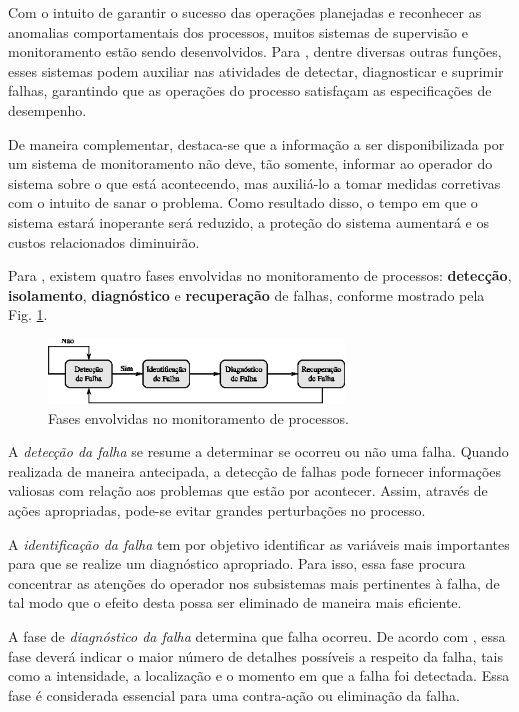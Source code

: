 Com o intuito de garantir o sucesso das operações planejadas e reconhecer as
anomalias comportamentais dos processos, muitos sistemas de supervisão e
monitoramento estão sendo desenvolvidos. Para ,
dentre diversas outras funções, esses sistemas podem auxiliar nas atividades de
detectar, diagnosticar e suprimir falhas, garantindo que as operações do
processo satisfaçam as especificações de desempenho.

De maneira complementar, destaca-se que a informação a ser disponibilizada por
um sistema de monitoramento não deve, tão somente, informar ao operador do
sistema sobre o que está acontecendo, mas auxiliá-lo a tomar medidas corretivas
com o intuito de sanar o problema. Como resultado disso, o tempo em que o
sistema estará inoperante será reduzido, a proteção do sistema aumentará e os
custos relacionados diminuirão.

Para , existem quatro fases envolvidas no monitoramento
de processos: {\bf detecção}, {\bf isolamento}, {\bf diagnóstico} e {\bf
recuperação} de falhas, conforme mostrado pela Fig.
\ref{fig:fases_monitoramento}.

\begin{figure}[htb]
\centering
    \includegraphics[width=0.7\textwidth]
                    {imgs/detec_diag/eps/fases_monitoramento}
    \caption{Fases envolvidas no monitoramento de processos.}
    \label{fig:fases_monitoramento}
\end{figure}

A {\it detecção da falha} se resume a determinar se ocorreu ou não uma falha.
Quando realizada de maneira antecipada, a detecção de falhas pode fornecer
informações valiosas com relação aos problemas que estão por acontecer.  Assim,
através de ações apropriadas, pode-se evitar grandes perturbações no processo.

A {\it identificação da falha} tem por objetivo identificar as variáveis mais
importantes para que se realize um diagnóstico apropriado. Para isso, essa fase
procura concentrar as atenções do operador nos subsistemas mais pertinentes à
falha, de tal modo que o efeito desta possa ser eliminado de maneira mais
eficiente.

A fase de {\it diagnóstico da falha} determina que falha ocorreu. De acordo com
, essa fase deverá indicar o maior número de detalhes
possíveis a respeito da falha, tais como a intensidade, a localização e o
momento em que a falha foi detectada. Essa fase é considerada essencial para uma
contra-ação ou eliminação da falha.

